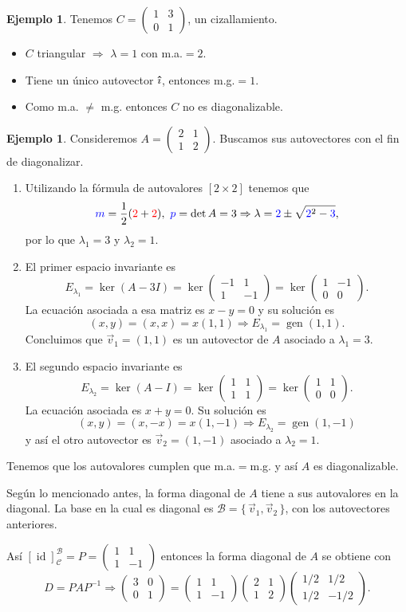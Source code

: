\documentclass[12pt]{article}
\theoremstyle{plain}
\theoremstyle{definition}
\newtheorem{Ex}[Th]{Ejemplo}           %
\theoremstyle{remark}
\DeclareMathOperator{\gen}{gen}     %
\DeclareMathOperator{\id}{id}       %
\newcommand{\la}{\lambda}           %
\newcommand{\ii}{\vu{\imath}}
\newcommand{\cB}{\mathcal{B}}       %
\newcommand{\cC}{\mathcal{C}}       %
\newcommand{\x}{\times}             %
\renewcommand{\:}{\colon}           %
\renewcommand{\.}{\Cdot}                %
\newcommand{\twobytwo}[4]{\begin{pmatrix} %
    #1 & #2 \\ #3 & #4 \end{pmatrix}}
\newcommand{\To}{\Rightarrow}
\newcommand{\set}[1]{\{\,#1\,\}}    %
\newcommand{\red}[1]{\textcolor{red}{#1}}
\newcommand{\blu}[1]{\textcolor{blue}{#1}}
\begin{document}
\begin{multicols}{2}
\begin{Ex} 
Tenemos $C=\twobytwo{1}{3}{0}{1}$, un cizallamiento. 
\begin{itemize}
  \itemsep=-0.5em
  \item $C$ triangular $\To$ $\la=1$ con m.a.$=2$.
  \item Tiene un único autovector $\ii$, entonces m.g.$=1$.
  \item Como m.a. $\neq$ m.g. entonces $C$ no es diagonalizable.
\end{itemize}
\end{Ex}

\begin{Ex}
  Consideremos $A=\twobytwo{2}{1}{1}{2}$. Buscamos sus autovectores con el fin de diagonalizar.
  \begin{enumerate}
    \itemsep=-0.5em
    \item Utilizando la fórmula de autovalores $[2\x 2]$ tenemos que 
    $$\blu{m}=\frac{1}{2}(\red{2}+\red{2}),\ \blu{p}=\det A=3\To \la=\blu{2}\pm\sqrt{\blu{2}^2-\blu{3}},$$
    por lo que $\la_1=3$ y $\la_2=1$.
    \item El primer espacio invariante es 
    $$E_{\la_1}=\ker(A-3I)=\ker\twobytwo{-1}{1}{1}{-1}=\ker\twobytwo{1}{-1}{0}{0}.$$
    La ecuación asociada a esa matriz es $x-y=0$ y su solución es 
    $$(x,y)=(x,x)=x(1,1)\To E_{\la_1}=\gen(1,1).$$
    Concluimos que $\vec{v}_1=(1,1)$ es un autovector de $A$ asociado a $\la_1=3$.
    \item El segundo espacio invariante es 
    $$E_{\la_2}=\ker(A-I)=\ker\twobytwo{1}{1}{1}{1}=\ker\twobytwo{1}{1}{0}{0}.$$
    La ecuación asociada es $x+y=0$. Su solución es 
    $$(x,y)=(x,-x)=x(1,-1)\To E_{\la_2}=\gen(1,-1)$$
    y así el otro autovector es $\vec{v}_2=(1,-1)$ asociado a $\la_2=1$.
  \end{enumerate}
  Tenemos que los autovalores cumplen que m.a.$=$m.g. y así $A$ es diagonalizable.\par 
  Según lo mencionado antes, la forma diagonal de $A$ tiene a sus autovalores en la diagonal. La base en la cual es diagonal es $\cB=\set{\vec{v}_1,\vec{v}_2}$, con los autovectores anteriores.\par 
  Así $[\id]^\cB_\cC=P=\twobytwo{1}{1}{1}{-1}$ entonces la forma diagonal de $A$ se obtiene con 
  $$D=PAP^{-1}\To\twobytwo{3}{0}{0}{1}=\twobytwo{1}{1}{1}{-1}\twobytwo{2}{1}{1}{2}\twobytwo{1/2}{1/2}{1/2}{-1/2}.$$
\end{Ex}


\end{multicols}
\end{document}
